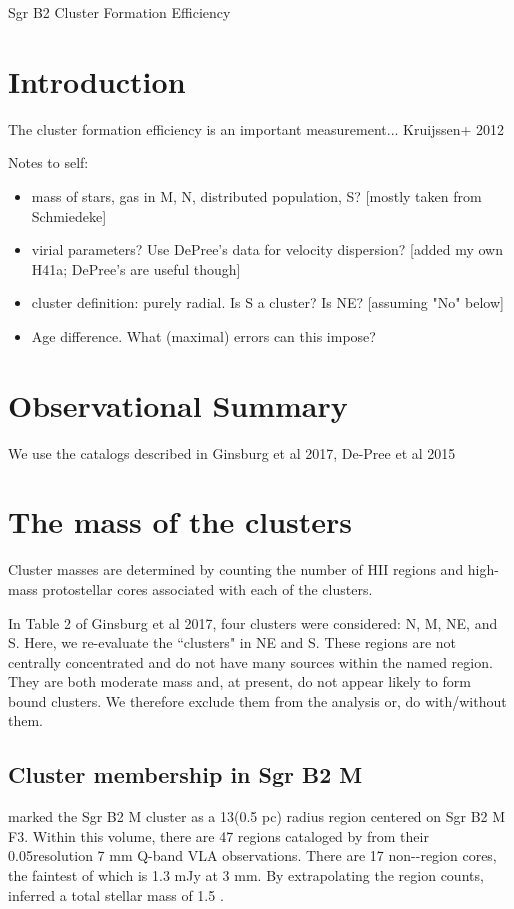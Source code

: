\documentclass[twocolumn]{aastex61}
\begin{document}
Sgr B2 Cluster Formation Efficiency

\section{Introduction}

The cluster formation efficiency is an important measurement...
Kruijssen+ 2012

Notes to self:
\begin{itemize}
    \item mass of stars, gas in M, N, distributed population, S? [mostly taken from Schmiedeke]
    \item virial parameters?  Use DePree's data for velocity dispersion?  [added my own H41a; DePree's are useful though]
    \item cluster definition: purely radial.  Is S a cluster?  Is NE?  [assuming "No" below]
    \item Age difference.  What (maximal) errors can this impose?
\end{itemize}

\section{Observational Summary}


We use the catalogs described in Ginsburg et al 2017, De-Pree et al 2015


\section{The mass of the clusters}
Cluster masses are determined by counting the number of HII regions and high-mass
protostellar cores associated with each of the clusters.

In Table 2 of Ginsburg et al 2017, four clusters were considered: N, M, NE, and
S.  Here, we re-evaluate the ``clusters" in NE and S.  These regions are not
centrally concentrated and do not have many sources within the named region.
They are both moderate mass and, at present, do not appear likely to form bound
clusters.  We therefore exclude them from the analysis {\color{red} or, do with/without
them}.



\subsection{Cluster membership in Sgr B2 M}
\citet{Schmiedeke2016a} marked the Sgr B2 M cluster as a 13\arcsec  (0.5 pc) radius
region centered on Sgr B2 M F3.  Within this volume, there are 47 \hii regions
cataloged by \citet{De-Pree201?} from their 0.05\arcsec resolution 7 mm Q-band
VLA observations.  There are 17 non-\hii-region cores, the faintest of which is
1.3 mJy at 3 mm.  By extrapolating the \hii region counts,
\citet{Ginsburg2017c} inferred a total stellar mass of 1.5 \msun.
\end{document}
